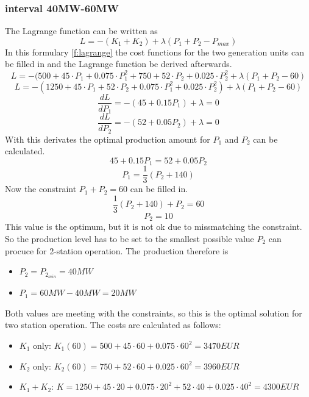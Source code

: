 \documentclass{article}
\begin{document}
	\subsubsection{interval 40MW-60MW}
		The Lagrange function can be written as
		\begin{equation}
			L=-(K_1+K_2)+\lambda(P_1+P_2-P_{max})
	 		\label{f:lagrange}
		\end{equation}
In this formulary \ref{f:lagrange} the cost functions for the two generation units can be filled in and the Lagrange function be derived afterwards.
		$$L=-(500+45\cdot P_1+0.075\cdot P_1^2+750+52\cdot P_2+0.025\cdot P_2^2+\lambda(P_1+P_2-60)$$
		$$L=-(1250+45\cdot P_1 + 52\cdot P_2 + 0.075\cdot P_1^2+0.025\cdot P_2^2)+\lambda(P_1+P_2-60)$$
		$$\frac{dL}{dP_1}=-(45+0.15P_1)+\lambda=0$$
		$$\frac{dL}{dP_2}=-(52+0.05P_2)+\lambda=0$$
With this derivates the optimal production amount for $P_1$ and $P_2$ can be calculated.
		$$45+0.15P_1=52+0.05P_2$$
		$$P_1=\frac{1}{3}(P_2+140)$$
	Now the constraint $P_1+P_2=60$ can be filled in.
		$$\frac{1}{3}(P_2+140)+P_2=60$$
		$$P_2=10$$
		This value is the optimum, but it is not ok due to missmatching the constraint. So the production level has to be set to the smallest possible value $P_2$ can procuce for 2-station operation. The production therefore is
		\begin{itemize}
			\item $P_2=P_{2_{min}}=40MW$
			\item $P_1=60MW-40MW=20MW$
		\end{itemize}
		Both values are meeting with the constraints, so this is the optimal solution for two station operation. The costs are calculated as follows:
		\begin{itemize}
			\item $K_1$ only: $K_1(60)=500+45\cdot 60+0.075\cdot 60^2=3470EUR$
			\item $K_2$ only: $K_2(60)=750+52\cdot 60+0.025\cdot 60^2=3960EUR$
			\item $K_1+K_2$: $K=1250+45\cdot 20+0.075\cdot 20^2 + 52\cdot 40+0.025\cdot 40^2=4300EUR$
		\end{itemize}
\end{document}

